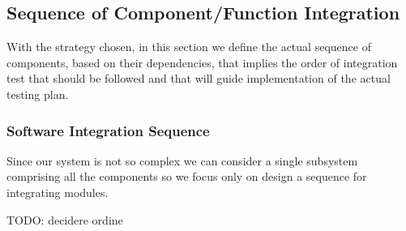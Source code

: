 \subsection{Sequence of Component/Function Integration}
With the strategy chosen, in this section we define the actual sequence of components, based on their dependencies, that implies the order of integration test that should be followed and that will guide implementation of the actual testing plan. 
\subsubsection{Software Integration Sequence}
Since our system is not so complex we can consider a single subsystem comprising all the components so we focus only on design a sequence for integrating modules.

TODO: decidere ordine